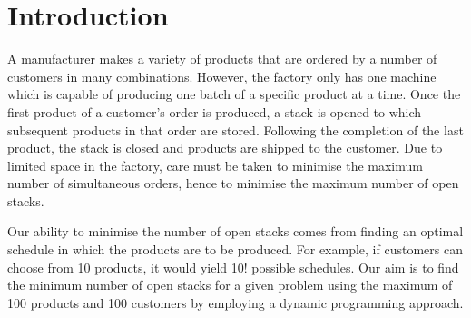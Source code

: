\section{Introduction}\label{Introduction}
 
A manufacturer makes a variety of products that are ordered by a number of
customers in many combinations. However, the factory only has one machine which
is capable of producing one batch of a specific product at a time. Once the
first product of a customer's order is produced, a stack is opened to which
subsequent products in that order are stored. Following the completion of the
last product, the stack is closed and products are shipped to the customer. Due
to limited space in the factory, care must be taken to minimise the maximum
number of simultaneous orders, hence to minimise the maximum number of open
stacks.

Our ability to minimise the number of open stacks comes from finding an optimal
schedule in which the products are to be produced. For example, if customers
can choose from 10 products, it would yield 10! possible schedules. Our aim is
to find the minimum number of open stacks for a given problem using the maximum
of 100 products and 100 customers by employing a dynamic programming approach.
